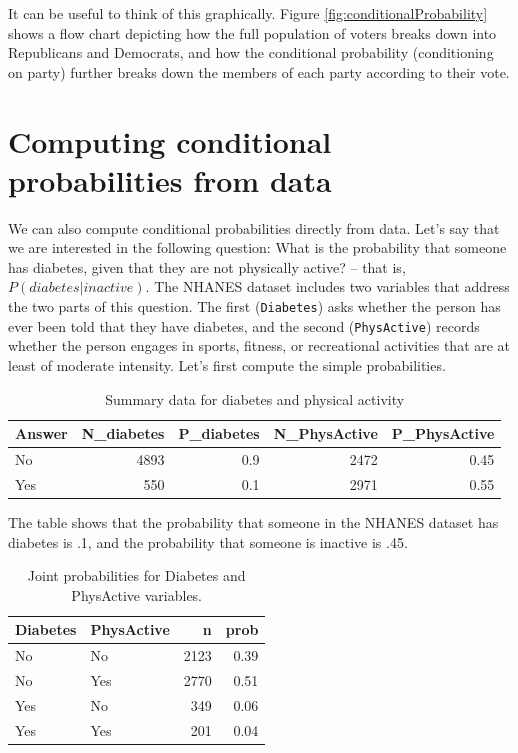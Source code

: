 \documentclass[12pt,]{book}
\theoremstyle{definition}
\theoremstyle{definition}
\theoremstyle{definition}
\theoremstyle{remark}
\begin{document}
It can be useful to think of this graphically. Figure \ref{fig:conditionalProbability} shows a flow chart depicting how the full population of voters breaks down into Republicans and Democrats, and how the conditional probability (conditioning on party) further breaks down the members of each party according to their vote.

\hypertarget{computing-conditional-probabilities-from-data}{%
\section{Computing conditional probabilities from data}\label{computing-conditional-probabilities-from-data}}

We can also compute conditional probabilities directly from data. Let's say that we are interested in the following question: What is the probability that someone has diabetes, given that they are not physically active? -- that is, \(P(diabetes|inactive)\). The NHANES dataset includes two variables that address the two parts of this question. The first (\texttt{Diabetes}) asks whether the person has ever been told that they have diabetes, and the second (\texttt{PhysActive}) records whether the person engages in sports, fitness, or recreational activities that are at least of moderate intensity. Let's first compute the simple probabilities.

\begin{table}

\caption{\label{tab:unnamed-chunk-27}Summary data for diabetes and physical activity}
\centering
\begin{tabular}[t]{l|r|r|r|r}
\hline
Answer & N\_diabetes & P\_diabetes & N\_PhysActive & P\_PhysActive\\
\hline
No & 4893 & 0.9 & 2472 & 0.45\\
\hline
Yes & 550 & 0.1 & 2971 & 0.55\\
\hline
\end{tabular}
\end{table}

The table shows that the probability that someone in the NHANES dataset has diabetes is .1, and the probability that someone is inactive is .45.

\begin{table}

\caption{\label{tab:unnamed-chunk-28}Joint probabilities for Diabetes and PhysActive variables.}
\centering
\begin{tabular}[t]{l|l|r|r}
\hline
Diabetes & PhysActive & n & prob\\
\hline
No & No & 2123 & 0.39\\
\hline
No & Yes & 2770 & 0.51\\
\hline
Yes & No & 349 & 0.06\\
\hline
Yes & Yes & 201 & 0.04\\
\hline
\end{tabular}
\end{table}
\end{document}
